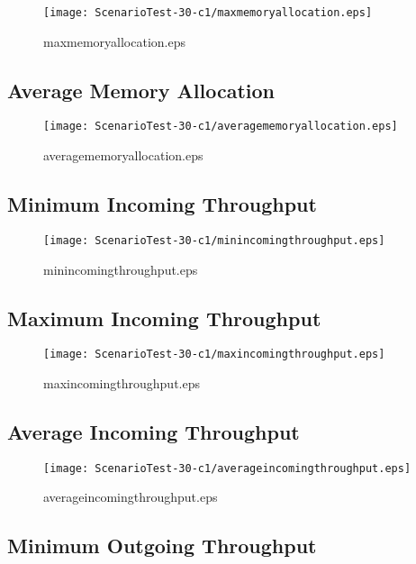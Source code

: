 \documentclass{elsart}
\begin{document}
\begin{figure}[ht]
\centering
\texttt{[image: ScenarioTest-30-c1/maxmemoryallocation.eps]}
\caption{maxmemoryallocation.eps}\label{fig:maxmemoryallocation}
\end{figure}

\clearpage
\subsection{Average Memory Allocation}

\begin{figure}[ht]
\centering
\texttt{[image: ScenarioTest-30-c1/averagememoryallocation.eps]}
\caption{averagememoryallocation.eps}\label{fig:averagememoryallocation}
\end{figure}

\clearpage
\subsection{Minimum Incoming Throughput}

\begin{figure}[ht]
\centering
\texttt{[image: ScenarioTest-30-c1/minincomingthroughput.eps]}
\caption{minincomingthroughput.eps}\label{fig:minincomingthroughput}
\end{figure}

\clearpage
\subsection{Maximum Incoming Throughput}

\begin{figure}[ht]
\centering
\texttt{[image: ScenarioTest-30-c1/maxincomingthroughput.eps]}
\caption{maxincomingthroughput.eps}\label{fig:maxincomingthroughput}
\end{figure}

\clearpage
\subsection{Average Incoming Throughput}

\begin{figure}[ht]
\centering
\texttt{[image: ScenarioTest-30-c1/averageincomingthroughput.eps]}
\caption{averageincomingthroughput.eps}\label{fig:averageincomingthroughput}
\end{figure}

\clearpage
\subsection{Minimum Outgoing Throughput}
\end{document}
